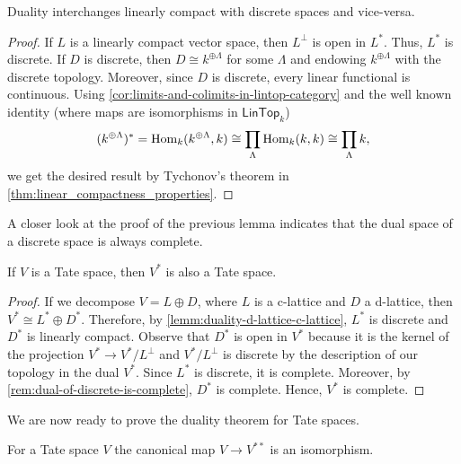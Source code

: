 \begin{lemma}\label{lemm:duality-d-lattice-c-lattice}
	Duality interchanges linearly compact with discrete spaces and vice-versa. 
\end{lemma}
\begin{proof}
	If $L$ is a linearly compact vector space, then $L^{\perp}$ is open in $L^{*}$. Thus, $L^{*}$ is discrete. If $D$ is discrete, then $D \cong k^{\oplus \Lambda}$ for some $\Lambda$ and endowing $k^{\oplus \Lambda}$ with the discrete topology. Moreover, since $D$ is discrete, every linear functional is continuous. Using \cref{cor:limits-and-colimits-in-lintop-category} and the well known identity (where maps are isomorphisms in $\mathsf{LinTop}_{k}$)
	\[
		(k^{\oplus \Lambda})^{*} = \operatorname{Hom}_{k}(k^{\oplus \Lambda}, k) \cong \prod_{\Lambda} \operatorname{Hom}_{k}(k, k) \cong \prod_{\Lambda} k,
	\]
	we get the desired result by Tychonov's theorem in \cref{thm:linear_compactness_properties}. 
\end{proof}
\begin{remark}\label{rem:dual-of-discrete-is-complete}
	A closer look at the proof of the previous lemma indicates that the dual space of a discrete space is always complete.
\end{remark}
\begin{proposition}\label{prop:dual-space-is-tate}
	If $V$ is a Tate space, then $V^{*}$ is also a Tate space.
\end{proposition}
\begin{proof}
	If we decompose $V = L \oplus D$, where $L$ is a c-lattice and $D$ a d-lattice, then $V^{*} \cong L^{*} \oplus D^{*}$. Therefore, by \cref{lemm:duality-d-lattice-c-lattice}, $L^{*}$ is discrete and $D^{*}$ is linearly compact. Observe that $D^{*}$ is open in $V^{*}$ because it is the kernel of the projection $V^{*} \to V^{*}/L^{\perp}$ and $V^{*}/L^{\perp}$ is discrete by the description of our topology in the dual $V^{*}$. Since $L^{*}$ is discrete, it is complete. Moreover, by \cref{rem:dual-of-discrete-is-complete}, $D^{*}$ is complete. Hence, $V^{*}$ is complete.
\end{proof}
We are now ready to prove the duality theorem for Tate spaces.
\begin{theorem}\label{thm:self-duality}
	For a Tate space $V$ the canonical map $V \to V^{**}$ is an isomorphism.
\end{theorem}
